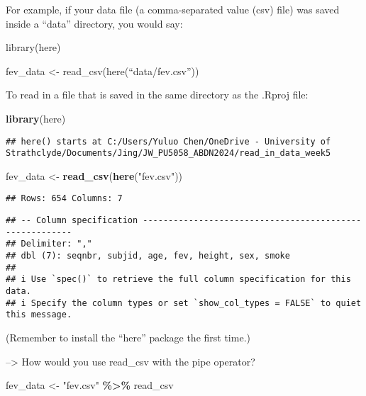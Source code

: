 \documentclass[
]{article}
\newenvironment{Shaded}{\begin{snugshade}}{\end{snugshade}}
\newcommand{\FunctionTok}[1]{\textcolor[rgb]{0.13,0.29,0.53}{\textbf{#1}}}
\newcommand{\NormalTok}[1]{#1}
\newcommand{\OtherTok}[1]{\textcolor[rgb]{0.56,0.35,0.01}{#1}}
\newcommand{\SpecialCharTok}[1]{\textcolor[rgb]{0.81,0.36,0.00}{\textbf{#1}}}
\newcommand{\StringTok}[1]{\textcolor[rgb]{0.31,0.60,0.02}{#1}}
\begin{document}
For example, if your data file (a comma-separated value (csv) file) was
saved inside a ``data'' directory, you would say:

library(here)

fev\_data \textless- read\_csv(here(``data/fev.csv''))

To read in a file that is saved in the same directory as the .Rproj
file:

\begin{Shaded}
\begin{Highlighting}[]
\FunctionTok{library}\NormalTok{(here)}
\end{Highlighting}
\end{Shaded}

\begin{verbatim}
## here() starts at C:/Users/Yuluo Chen/OneDrive - University of Strathclyde/Documents/Jing/JW_PU5058_ABDN2024/read_in_data_week5
\end{verbatim}

\begin{Shaded}
\begin{Highlighting}[]
\NormalTok{fev\_data }\OtherTok{\textless{}{-}} \FunctionTok{read\_csv}\NormalTok{(}\FunctionTok{here}\NormalTok{(}\StringTok{"fev.csv"}\NormalTok{))}
\end{Highlighting}
\end{Shaded}

\begin{verbatim}
## Rows: 654 Columns: 7
\end{verbatim}

\begin{verbatim}
## -- Column specification --------------------------------------------------------
## Delimiter: ","
## dbl (7): seqnbr, subjid, age, fev, height, sex, smoke
## 
## i Use `spec()` to retrieve the full column specification for this data.
## i Specify the column types or set `show_col_types = FALSE` to quiet this message.
\end{verbatim}

(Remember to install the ``here'' package the first time.)

--\textgreater{} How would you use read\_csv with the pipe operator?

\begin{Shaded}
\begin{Highlighting}[]
\NormalTok{fev\_data }\OtherTok{\textless{}{-}} \StringTok{"fev.csv"} \SpecialCharTok{\%\textgreater{}\%}\NormalTok{ read\_csv}
\end{Highlighting}
\end{Shaded}
\end{document}
